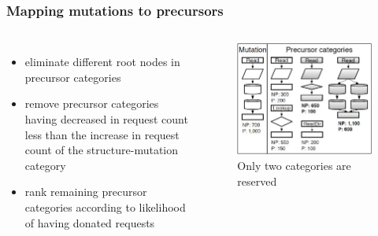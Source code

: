 \documentclass[11pt]{beamer}
\begin{document}
\begin{frame}
\frametitle{Mapping mutations to precursors}
\begin{columns}
\begin{itemize}
  \item eliminate different root nodes in precursor categories
  \item remove precursor categories having decreased in request count less than the increase in
  request count of the structure-mutation category
  \item rank remaining precursor categories according to likelihood of
  having donated requests
\end{itemize}
\begin{figure}[htbp]
\centering
\includegraphics[width=\textwidth]{res/mapping.jpg}
\caption{Only two categories are reserved}
\end{figure}
\end{columns}
\end{frame}
\end{document}
